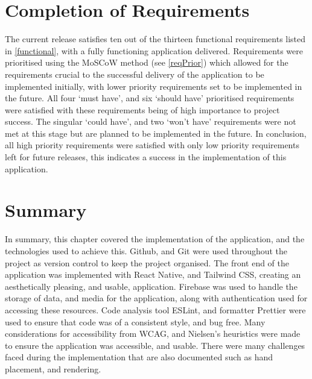 \section{Completion of Requirements}
The current release satisfies ten out of the thirteen functional requirements listed in \ref{functional}, with a fully functioning application delivered. Requirements were prioritised using the MoSCoW method (see \ref{reqPrior}) which allowed for the requirements crucial to the successful delivery of the application to be implemented initially, with lower priority requirements set to be implemented in the future. All four `must have', and six `should have' prioritised requirements were satisfied with these requirements being of high importance to project success. The singular `could have', and two `won't have' requirements were not met at this stage but are planned to be implemented in the future. In conclusion, all high priority requirements were satisfied with only low priority requirements left for future releases, this indicates a success in the implementation of this application.


\section{Summary}

In summary, this chapter covered the implementation of the application, and the technologies used to achieve this. Github, and Git were used throughout the project as version control to keep the project organised. The front end of the application was implemented with React Native, and Tailwind CSS, creating an aesthetically pleasing, and usable, application. Firebase was used to handle the storage of data, and media for the application, along with authentication used for accessing these resources. Code analysis tool ESLint, and formatter Prettier were used to ensure that code was of a consistent style, and bug free. Many considerations for accessibility from WCAG, and Nielsen's heuristics were made to ensure the application was accessible, and usable. There were many challenges faced during the implementation that are also documented such as hand placement, and rendering.